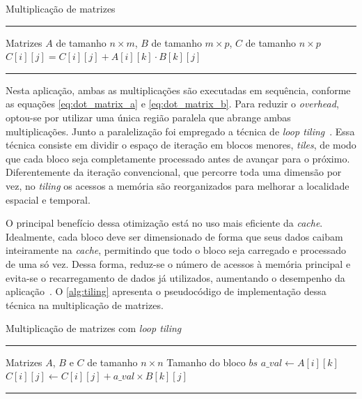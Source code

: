 \begin{algorithm}[htb]
	\caption{Multiplicação de matrizes}
	\label{alg:mul_matrix}
	\hrule
	\begin{algorithmic}[1]
		\REQUIRE Matrizes $A$ de tamanho $n \times m$, $B$ de tamanho $m \times p$, $C$ de tamanho $n \times p$
		\STATE $C[i][j] = C[i][j] + A[i][k] \cdot B[k][j]$
		\ENDFOR
		\ENDFOR
		\ENDFOR
	\end{algorithmic}
	\hrule
\end{algorithm}

Nesta aplicação, ambas as multiplicações são executadas em sequência, conforme as equações \autoref{eq:dot_matrix_a} e \autoref{eq:dot_matrix_b}. Para reduzir o \textit{overhead}, optou-se por utilizar uma única região paralela que abrange ambas multiplicações. Junto a paralelização foi empregado a técnica de \textit{loop tiling}~\cite{bakos2016}. Essa técnica consiste em dividir o espaço de iteração em blocos menores, \textit{tiles}, de modo que cada bloco seja completamente processado antes de avançar para o próximo. Diferentemente da iteração convencional, que percorre toda uma dimensão por vez, no \textit{tiling} os acessos a memória são reorganizados para melhorar a localidade espacial e temporal.

O principal benefício dessa otimização está no uso mais eficiente da \textit{cache}. Idealmente, cada bloco deve ser dimensionado de forma que seus dados caibam inteiramente na \textit{cache}, permitindo que todo o bloco seja carregado e processado de uma só vez. Dessa forma, reduz-se o número de acessos à memória principal e evita-se o recarregamento de dados já utilizados, aumentando o desempenho da aplicação~\cite{bakos2016}. O \autoref{alg:tiling} apresenta o pseudocódigo de implementação dessa técnica na multiplicação de matrizes.

\begin{algorithm}[htb]
	\caption{Multiplicação de matrizes com \textit{loop tiling}}
	\label{alg:tiling}
	\hrule
	\begin{algorithmic}[1]
		\REQUIRE Matrizes $A$, $B$ e $C$ de tamanho $n \times n$
		\REQUIRE Tamanho do bloco $bs$
		\STATE $a\_val \gets A[i][k]$
		\STATE $C[i][j] \gets C[i][j] + a\_val \times B[k][j]$
		\ENDFOR
		\ENDFOR
		\ENDFOR
		\ENDFOR
		\ENDFOR
	\end{algorithmic}
	\hrule
	\fonte{}
\end{algorithm}

